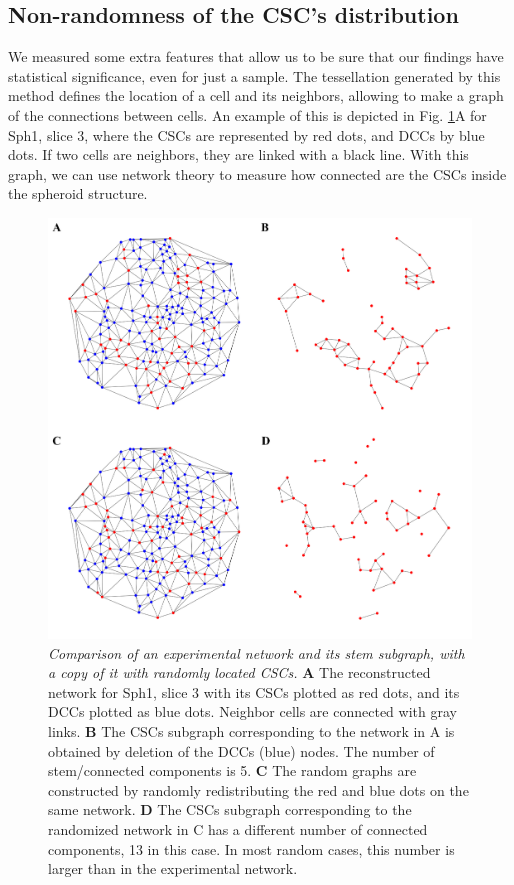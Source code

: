 \documentclass[fleqn,10pt]{wlscirep}
\begin{document}
\subsection*{Non-randomness of the CSC's distribution}

We measured some extra features that allow us to be sure that our findings have statistical significance, even for just a sample. The tessellation generated by this method defines the location of a cell and its neighbors, allowing to make a graph of the connections between cells. An example of this is depicted in Fig. \ref{fig: Delaunay sph1 slice3}A for \textsf{ Sph1, slice 3}, where the CSCs are represented by red dots, and DCCs by blue dots. If two cells are neighbors, they are linked with a black line. With this graph, we can use network theory to measure how connected are the CSCs inside the spheroid structure. 

\begin{figure}[!ht]
        \centering
        \includegraphics[width=\textwidth]{images/network-eps-converted-to.pdf}
    \caption{\emph{Comparison of an experimental network and its stem subgraph, with a copy of it with randomly located CSCs.} {\bf A} The reconstructed network for \textsf{ Sph1, slice 3} with its CSCs plotted as red dots, and its DCCs plotted as blue dots. Neighbor cells are connected with gray links. {\bf B} The CSCs subgraph corresponding to the network in A is obtained by deletion of the DCCs (blue) nodes. The number of stem/connected components is 5. {\bf C} The random graphs are constructed by randomly redistributing the red and blue dots on the same network. {\bf D} The  CSCs subgraph corresponding to the randomized network in C has a different number of connected components, 13 in this case. In most random cases, this number is larger than in the experimental network. }
    \label{fig: Delaunay sph1 slice3}
\end{figure}
\end{document}
